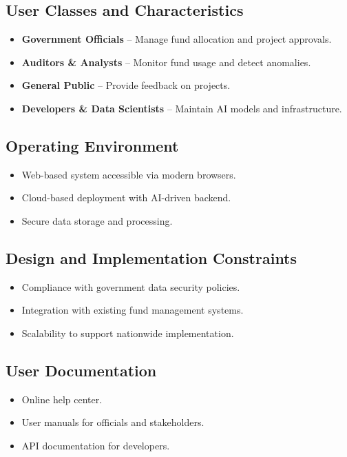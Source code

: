 \documentclass{article}
\begin{document}
\subsection{User Classes and Characteristics}
\begin{itemize}
    \item \textbf{Government Officials} – Manage fund allocation and project approvals.
    \item \textbf{Auditors \& Analysts} – Monitor fund usage and detect anomalies.
    \item \textbf{General Public} – Provide feedback on projects.
    \item \textbf{Developers \& Data Scientists} – Maintain AI models and infrastructure.
\end{itemize}

\subsection{Operating Environment}
\begin{itemize}
    \item Web-based system accessible via modern browsers.
    \item Cloud-based deployment with AI-driven backend.
    \item Secure data storage and processing.
\end{itemize}

\subsection{Design and Implementation Constraints}
\begin{itemize}
    \item Compliance with government data security policies.
    \item Integration with existing fund management systems.
    \item Scalability to support nationwide implementation.
\end{itemize}

\subsection{User Documentation}
\begin{itemize}
    \item Online help center.
    \item User manuals for officials and stakeholders.
    \item API documentation for developers.
\end{itemize}
\end{document}
